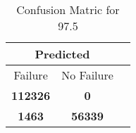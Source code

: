\begin{table}[] 
\caption{Confusion Matric for 97.5} 
\label{Table: Prediction Accuracy-DMD97.5OnlySunEKF-combinationReflectionperfectNoFailurePrediction-Reflection} 
\centering 
\begin{tabular} 
 {@{}ccc@{}} 
\toprule 
\multicolumn{2}{c}{\textbf{Predicted}}
 \\ \midrule 
\multicolumn{1}{|c|}{Failure} & 
\multicolumn{1}{c|}{No Failure}
 \\ \midrule 
\multicolumn{1}{|c|}{\color{green}\textbf{112326}} & 
\multicolumn{1}{c|}{\color{red}\textbf{0}}
 \\ \midrule 
\multicolumn{1}{|c|}{\color{red}\textbf{1463}} & 
\multicolumn{1}{c|}{\color{green}\textbf{56339}}
 \\ \bottomrule 
\end{tabular} 
\end{table} 
